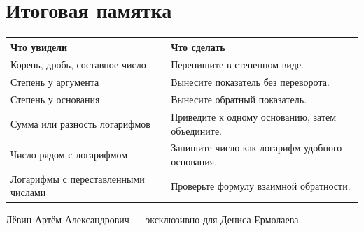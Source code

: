 \documentclass[a4paper,11pt]{article}
\begin{document}
\section*{Итоговая памятка}
\begin{tabularx}{\linewidth}{@{}p{.42\linewidth}X@{}}
\toprule
\textbf{Что увидели} & \textbf{Что сделать}\\
\midrule
Корень, дробь, составное число & Перепишите в степенном виде.\\
Степень у аргумента & Вынесите показатель без переворота.\\
Степень у основания & Вынесите обратный показатель.\\
Сумма или разность логарифмов & Приведите к одному основанию, затем объедините.\\
Число рядом с логарифмом & Запишите число как логарифм удобного основания.\\
Логарифмы с переставленными числами & Проверьте формулу взаимной обратности.\\
\bottomrule
\end{tabularx}
\vfill
\begin{center}
\textcolor{softgray}{\small Лёвин Артём Александрович --- эксклюзивно для Дениса Ермолаева}
\end{center}
\end{document}
